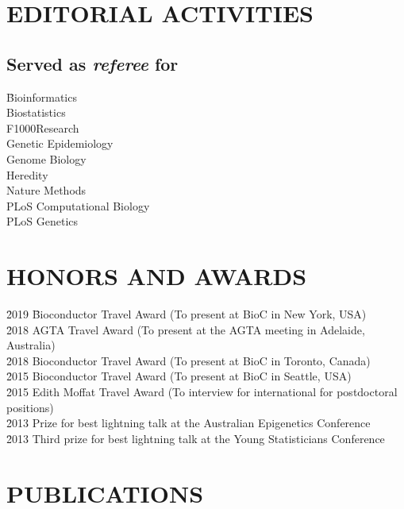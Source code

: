 \documentclass[11pt,letterpaper,pdf]{article}
\begin{document}
\section*{EDITORIAL ACTIVITIES}

\subsection*{Served as \textit{referee} for}

\begin{tabbing}
  \=Bioinformatics\\
  \>Biostatistics\\
  \>F1000Research\\
  \>Genetic Epidemiology\\
  \>Genome Biology\\
  \>Heredity\\
  \>Nature Methods\\
  \>PLoS Computational Biology\\
  \>PLoS Genetics\\
\end{tabbing}

\section*{HONORS AND AWARDS}

\begin{tabbing}
  \= 2019 \hspace*{0.5cm} \= Bioconductor Travel Award (To present at BioC in New York, USA)\\
  \= 2018 \> AGTA Travel Award (To present at the AGTA meeting in Adelaide, Australia)\\
  \= 2018 \> Bioconductor Travel Award (To present at BioC in Toronto, Canada)\\
  \= 2015 \> Bioconductor Travel Award (To present at BioC in Seattle, USA)\\
  \= 2015 \> Edith Moffat Travel Award (To interview for international for postdoctoral positions)\\
  \= 2013 \> Prize for best lightning talk at the Australian Epigenetics Conference\\
  \= 2013 \> Third prize for best lightning talk at the Young Statisticians Conference
\end{tabbing}

\section*{PUBLICATIONS}
\end{document}
